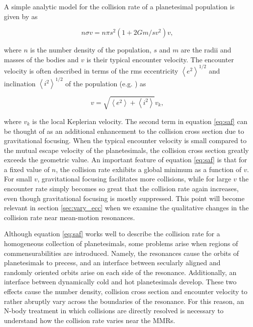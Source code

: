 A simple analytic model for the collision rate of a planetesimal population is given by \cite{safronov69} as

\begin{equation}\label{eq:saf}
	n \sigma v = n \pi s^{2} \left( 1 + 2 G m / s v^{2} \right) v,
\end{equation}

\noindent where $n$ is the number density of the population, $s$ and $m$ are the radii and masses of the bodies and $v$ is 
their typical encounter velocity. The encounter velocity is often described in terms of the rms eccentricity 
$\left<e^{2}\right>^{1/2}$ and inclination $\left<i^{2}\right>^{1/2}$ of the population (e.g. \cite{lissauer93}) as

\begin{equation}\label{eq:eccincvel}
	v = \sqrt{\left< e^{2} \right> + \left< i^{2} \right>} v_{k},
\end{equation}

\noindent where $v_{k}$ is the local Keplerian velocity. The second term in equation \ref{eq:saf} can be thought of as an 
additional enhancement to the collision cross section due to gravitational focusing. When the typical encounter velocity is small 
compared to the mutual escape velocity of the planetesimals, the collision cross section greatly exceeds the geometric value. An 
important feature of equation \ref{eq:saf} is that for a fixed value of $n$, the collision rate exhibits a global minimum as a function 
of $v$. For small $v$, gravitational focusing facilitates more collisions, while for large $v$ the encounter rate simply becomes so 
great that the collision rate again increases, even though gravitational focusing is mostly suppressed. This point will become 
relevant in section \ref{sec:vary_ecc} when we examine the qualitative changes in the collision rate near mean-motion 
resonances.

Although equation \ref{eq:saf} works well to describe the collision rate for a homogeneous collection of planetesimals, some 
problems arise when regions of commensurabilities are introduced. Namely, the resonances cause the orbits of planetesimals to 
precess, and an interface between secularly aligned and randomly oriented orbits arise on each side of the resonance. 
Additionally, an interface between dynamically cold and hot planetesimals develop. These two effects cause the number density, 
collision cross section and encounter velocity to rather abruptly vary across the boundaries of the resonance. For this reason, an 
N-body treatment in which collisions are directly resolved is necessary to understand how the collision rate varies near the 
MMRs.

